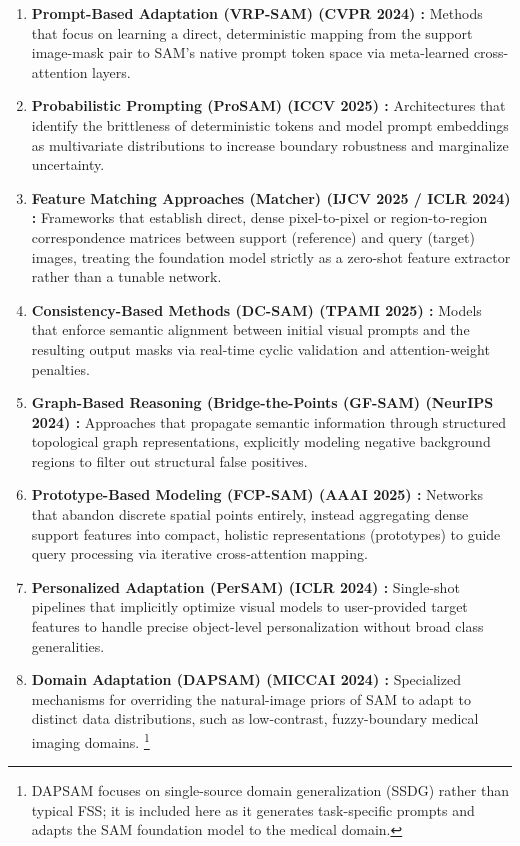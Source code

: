 \documentclass[journal,12pt,onecolumn,draftclsnofoot]{IEEEtran}
\begin{document}
\begin{enumerate}
    \item \textbf{Prompt-Based Adaptation (VRP-SAM) (CVPR 2024) \cite{sun2024vrp} :} Methods that focus on learning a direct, deterministic mapping from the support image-mask pair to SAM's native prompt token space via meta-learned cross-attention layers.
    \item \textbf{Probabilistic Prompting (ProSAM) (ICCV 2025) \cite{wang2025prosam} :} Architectures that identify the brittleness of deterministic tokens and model prompt embeddings as multivariate distributions to increase boundary robustness and marginalize uncertainty.
    \item \textbf{Feature Matching Approaches (Matcher) (IJCV 2025 / ICLR 2024) \cite{liu2023matcher} :} Frameworks that establish direct, dense pixel-to-pixel or region-to-region correspondence matrices between support (reference) and query (target) images, treating the foundation model strictly as a zero-shot feature extractor rather than a tunable network.
    \item \textbf{Consistency-Based Methods (DC-SAM) (TPAMI 2025) \cite{qi2025dcsam} :} Models that enforce semantic alignment between initial visual prompts and the resulting output masks via real-time cyclic validation and attention-weight penalties.
    \item \textbf{Graph-Based Reasoning (Bridge-the-Points (GF-SAM) (NeurIPS 2024) \cite{zhang2024bridge} :} Approaches that propagate semantic information through structured topological graph representations, explicitly modeling negative background regions to filter out structural false positives.
    \item \textbf{Prototype-Based Modeling (FCP-SAM) (AAAI 2025) \cite{park2025fcpsam} :} Networks that abandon discrete spatial points entirely, instead aggregating dense support features into compact, holistic representations (prototypes) to guide query processing via iterative cross-attention mapping.
    \item \textbf{Personalized Adaptation (PerSAM) (ICLR 2024) \cite{zhang2024persam} :} Single-shot pipelines that implicitly optimize visual models to user-provided target features to handle precise object-level personalization without broad class generalities.
    \item \textbf{Domain Adaptation (DAPSAM) (MICCAI 2024) \cite{wei2024prompting} :} Specialized mechanisms for overriding the natural-image priors of SAM to adapt to distinct data distributions, such as low-contrast, fuzzy-boundary medical imaging domains. \footnote{\tiny DAPSAM focuses on single-source domain generalization (SSDG) rather than typical FSS; it is included here as it generates task-specific prompts and adapts the SAM foundation model to the medical domain.} 
\end{enumerate}
\end{document}
